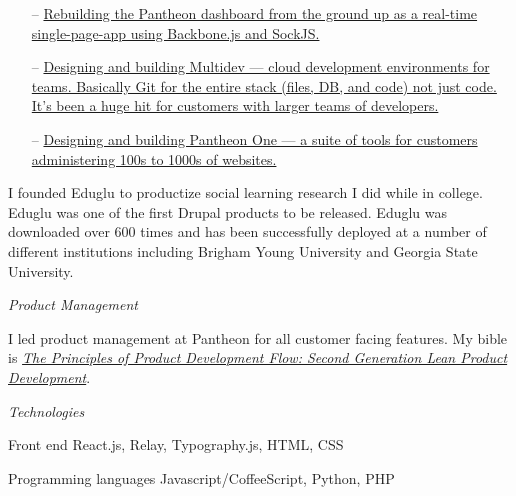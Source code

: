 \documentclass[11pt]{article}
\newenvironment{mydescription}
{ \begin{description}
    \setlength{\itemsep}{0pt}
    \setlength{\parskip}{0pt}
    \setlength{\parsep}{0pt}     }
{ \end{description}                  }
\begin{document}
\begin{itemize}
  \item[--] \href{https://www.getpantheon.com/news/apollo-launched}{Rebuilding the Pantheon dashboard from the ground up as a real-time single-page-app using Backbone.js and SockJS.}
  \item[--] \href{http://techcrunch.com/2013/07/10/pantheon-multidev/}{Designing and building Multidev — cloud development environments for teams. Basically Git for the entire stack (files, DB, and code) not just code. It’s been a huge hit for customers with larger teams of developers.}
  \item[--] \href{https://www.getpantheon.com/pantheon-one}{Designing and building Pantheon One — a suite of tools for customers administering 100s to 1000s of websites.}
\end{itemize}

\bigskip


\noindent I founded Eduglu to productize social learning research I did while in college. Eduglu was one of the first Drupal products to be released. Eduglu was downloaded over 600 times and has been successfully deployed at a number of different institutions including Brigham Young University and Georgia State University.

\bigskip

\medskip

\noindent\emph{Product Management}

\medskip

\noindent I led product management at Pantheon for all customer facing features. My bible is \emph{\href{http://www.amazon.com/The-Principles-Product-Development-Flow/dp/1935401009/}{The Principles of Product Development Flow: Second Generation Lean Product Development}}.

\bigskip
\medskip

\noindent\emph{Technologies}

\medskip

\begin{mydescription}
  \item[Front end] React.js, Relay, Typography.js, HTML, CSS
  \item[Programming languages] Javascript/CoffeeScript, Python, PHP
\end{mydescription}
\end{document}
